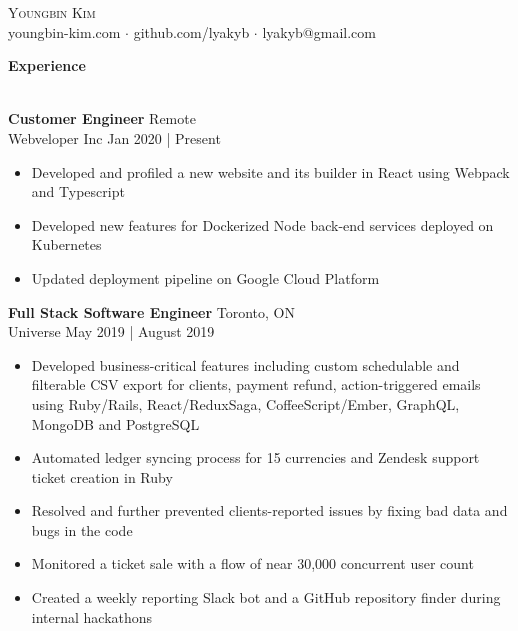 \documentclass[a4paper]{article}
\newcommand{\lineunder} {
    \vspace{-8pt} \\
    \hspace{-18pt} \hrulefill \\
}
\newcommand{\header} [1] {
    {\hspace{-18pt}\vspace*{6pt} \textcolor{headerGray}{\textbf{\large{#1}}}}
    \vspace{-6pt} \lineunder
}
\begin{document}
\raggedright
\vspace*{-1cm}

\begin{center}
	{\Huge \scshape {Youngbin Kim}}\\
	youngbin-kim.com $\cdot$ github.com/lyakyb $\cdot$ lyakyb@gmail.com\\
\end{center}

\header{Experience}
\vspace{1mm}

\textbf{\normalsize Customer Engineer} \hfill Remote\\
\textcolor{jobGray}{Webveloper Inc} \hfill \textcolor{dateGray}{Jan 2020 | Present}\\
\vspace{-2mm}
\begin{itemize}[leftmargin=1cm ] \itemsep -0.5pt
	\item Developed and profiled a new website and its builder in React using Webpack and Typescript
	\item Developed new features for Dockerized Node back-end services deployed on Kubernetes
	\item Updated deployment pipeline on Google Cloud Platform
\end{itemize}
\textbf{\normalsize Full Stack Software Engineer} \hfill Toronto, ON\\
\textcolor{jobGray}{Universe} \hfill \textcolor{dateGray}{May 2019 | August 2019}\\
\vspace{-2mm}
\begin{itemize}[leftmargin=1cm ] \itemsep -0.5pt
	\item Developed business-critical features including custom schedulable and filterable CSV export for clients, payment refund, action-triggered emails using Ruby/Rails, React/ReduxSaga, CoffeeScript/Ember, GraphQL, MongoDB and PostgreSQL  
	\item Automated ledger syncing process for 15 currencies and Zendesk support ticket creation in Ruby
	\item Resolved and further prevented clients-reported issues by fixing bad data and bugs in the code
	\item Monitored a ticket sale with a flow of near 30,000 concurrent user count
	\item Created a weekly reporting Slack bot and a GitHub repository finder during internal hackathons 
\end{itemize}
\end{document}
